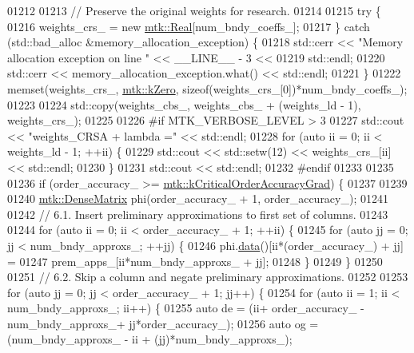 \begin{DoxyCode}
{{01212 
01213   \textcolor{comment}{// Preserve the original weights for research.}
01214 
01215   \textcolor{keywordflow}{try} \{
01216     weights\_crs\_ = \textcolor{keyword}{new} \hyperlink{group__c01-roots_gac080bbbf5cbb5502c9f00405f894857d}{mtk::Real}[num\_bndy\_coeffs\_];
01217   \} \textcolor{keywordflow}{catch} (std::bad\_alloc &memory\_allocation\_exception) \{
01218     std::cerr << \textcolor{stringliteral}{"Memory allocation exception on line "} << \_\_LINE\_\_ - 3 <<
01219       std::endl;
01220     std::cerr << memory\_allocation\_exception.what() << std::endl;
01221   \}
01222   memset(weights\_crs\_, \hyperlink{group__c01-roots_ga59a451a5fae30d59649bcda274fea271}{mtk::kZero}, \textcolor{keyword}{sizeof}(weights\_crs\_[0])*num\_bndy\_coeffs\_);
01223 
01224   std::copy(weights\_cbs\_, weights\_cbs\_ + (weights\_ld - 1), weights\_crs\_);
01225 
01226 \textcolor{preprocessor}{  #if MTK\_VERBOSE\_LEVEL > 3}
01227   std::cout << \textcolor{stringliteral}{"weights\_CRSA + lambda ="} << std::endl;
01228   \textcolor{keywordflow}{for} (\textcolor{keyword}{auto} ii = 0; ii < weights\_ld - 1; ++ii) \{
01229     std::cout << std::setw(12) << weights\_crs\_[ii] << std::endl;
01230   \}
01231   std::cout << std::endl;
01232 \textcolor{preprocessor}{  #endif}
01233 
01235 
01236   \textcolor{keywordflow}{if} (order\_accuracy\_ >= \hyperlink{group__c01-roots_ga295dd2f403c775ecd942c22b5a777496}{mtk::kCriticalOrderAccuracyGrad}) \{
01237 
01239 
01240     \hyperlink{classmtk_1_1DenseMatrix}{mtk::DenseMatrix} phi(order\_accuracy\_ + 1, order\_accuracy\_);
01241 
01242     \textcolor{comment}{// 6.1. Insert preliminary approximations to first set of columns.}
01243 
01244     \textcolor{keywordflow}{for} (\textcolor{keyword}{auto} ii = 0; ii < order\_accuracy\_ + 1; ++ii) \{
01245       \textcolor{keywordflow}{for} (\textcolor{keyword}{auto} jj = 0; jj < num\_bndy\_approxs\_; ++jj) \{
01246         phi.\hyperlink{classmtk_1_1DenseMatrix_a0c33b8a9e01d157c61ddbdf807c25d84}{data}()[ii*(order\_accuracy\_) + jj] =
01247           prem\_apps\_[ii*num\_bndy\_approxs\_ + jj];
01248       \}
01249     \}
01250 
01251     \textcolor{comment}{// 6.2. Skip a column and negate preliminary approximations.}
01252 
01253     \textcolor{keywordflow}{for} (\textcolor{keyword}{auto} jj = 0; jj < order\_accuracy\_ + 1; jj++) \{
01254       \textcolor{keywordflow}{for} (\textcolor{keyword}{auto} ii = 1; ii < num\_bndy\_approxs\_; ii++) \{
01255         \textcolor{keyword}{auto} de = (ii+ order\_accuracy\_ - num\_bndy\_approxs\_+ jj*order\_accuracy\_);
01256         \textcolor{keyword}{auto} og = (num\_bndy\_approxs\_ - ii + (jj)*num\_bndy\_approxs\_);
}}
\end{DoxyCode}
